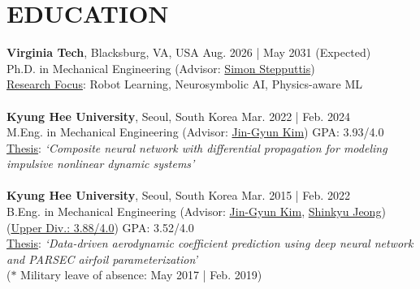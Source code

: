 \documentclass[a4paper,10pt]{extarticle}
\begin{document}
\section*{EDUCATION}
\noindent
\textbf{Virginia Tech}, Blacksburg, VA, USA \hfill Aug. 2026 | May 2031 (Expected)\\ %
Ph.D. in Mechanical Engineering {\small(Advisor: \href{https://simonstepputtis.com/}{Simon Stepputtis})} \hfill \\ %
\underline{Research Focus}: Robot Learning, Neurosymbolic AI, Physics-aware ML\\
\\
\textbf{Kyung Hee University}, Seoul, South Korea \hfill Mar. 2022 | Feb. 2024\\ %
M.Eng. in Mechanical Engineering {\small(Advisor: \href{https://www.jin-gyun-kim.com/}{Jin-Gyun Kim})} \hfill GPA: 3.93/4.0\\ %
\underline{Thesis}: \textsl{{\small `Composite neural network with differential propagation for modeling impulsive nonlinear dynamic systems'}}\\
\\
\textbf{Kyung Hee University}, Seoul, South Korea \hfill Mar. 2015 | Feb. 2022\\ %
B.Eng. in Mechanical Engineering {\small(Advisor: \href{https://www.jin-gyun-kim.com/}{Jin-Gyun Kim}, \href{https://scholar.google.com/citations?user=j2drPmMAAAAJ}{Shinkyu Jeong})}\hfill {(\ul{Upper Div.: 3.88/4.0})} GPA: 3.52/4.0\\ %
\underline{Thesis}: {\small\textsl{{`Data-driven aerodynamic coefficient prediction using deep neural network and PARSEC airfoil parameterization'}}}\\  %
{\footnotesize{($*$ Military leave of absence: May 2017 | Feb. 2019)}}
\end{document}
